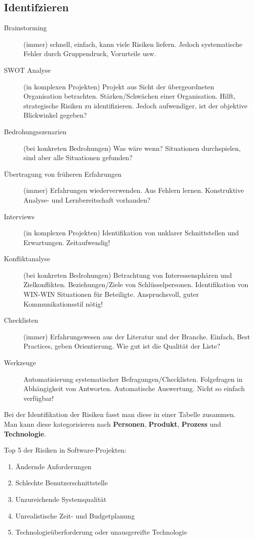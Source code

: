 \subsection{Identifzieren}
\begin{description}
	\item[Brainstorming] (immer) schnell, einfach, kann viele Risiken liefern. Jedoch systematische Fehler durch Gruppendruck, Vorurteile usw.
	\item[SWOT Analyse] (in komplexen Projekten) Projekt aus Sicht der übergeordneten Organisation betrachten. Stärken/Schwächen einer Organisation. Hilft, strategische Risiken zu identifizieren. Jedoch aufwendiger, ist der objektive Blickwinkel gegeben?
	\item[Bedrohungsszenarien] (bei konkreten Bedrohungen) Was wäre wenn? Situationen durchspielen, sind aber alle Situationen gefunden?
	\item[Übertragung von früheren Erfahrungen] (immer) Erfahrungen wiederverwenden. Aus Fehlern lernen. Konstruktive Analyse- und Lernbereitschaft vorhanden?
	\item[Interviews] (in komplexen Projekten) Identifikation von unklarer Schnittstellen und Erwartungen. Zeitaufwendig!
	\item[Konfliktanalyse] (bei konkreten Bedrohungen) Betrachtung von Interessensphären und Zielkonflikten. Beziehungen/Ziele von Schlüsselpersonen. Identifikation von WIN-WIN Situationen für Beteiligte. Anspruchsvoll, guter Kommunikationsstil nötig!
	\item[Checklisten] (immer) Erfahrungswesen aus der Literatur und der Branche. Einfach, Best Practices, geben Orientierung. Wie gut ist die Qualität der Liste?
	\item[Werkzeuge] Automatisierung systematischer Befragungen/Checklisten. Folgefragen in Abhängigkeit von Antworten. Automatische Auswertung. Nicht so einfach verfügbar!
\end{description}

Bei der Identifikation der Risiken fasst man diese in einer Tabelle zusammen. Man kann diese kategorisieren nach \textbf{Personen}, \textbf{Produkt}, \textbf{Prozess} und \textbf{Technologie}.

Top 5 der Risiken in Software-Projekten: 
\begin{enumerate}
	\item Ändernde Anforderungen
	\item Schlechte Benutzerschnittstelle
	\item Unzureichende Systemqualität
	\item Unrealistische Zeit- und Budgetplanung
	\item Technologieüberforderung oder unausgereifte Technologie
\end{enumerate}
	
